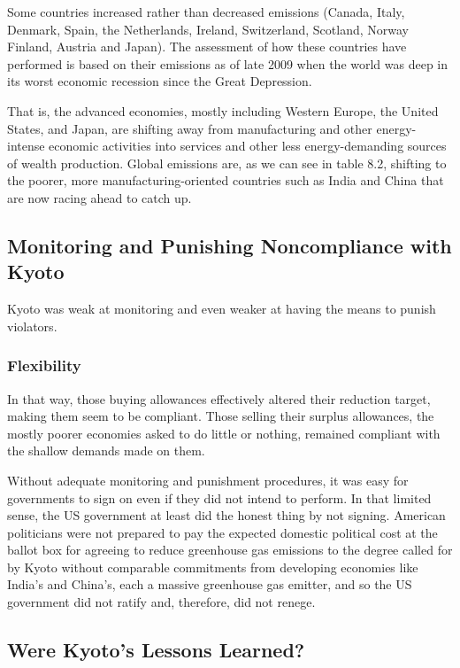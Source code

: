 Some countries increased rather than decreased emissions (Canada, Italy, Denmark, Spain, the Netherlands, Ireland, Switzerland, Scotland, Norway Finland, Austria and Japan). The assessment of how these countries have performed is based on their emissions as of late 2009 when the world was deep in its worst economic recession since the Great Depression.

That is, the advanced economies, mostly including Western Europe, the United States, and Japan, are shifting away from manufacturing and other energy-intense economic activities into services and other less energy-demanding sources of wealth production. Global emissions are, as we can see in table 8.2, shifting to the poorer, more manufacturing-oriented countries such as India and China that are now racing ahead to catch up.

\subsection{Monitoring and Punishing Noncompliance with Kyoto}

Kyoto was weak at monitoring and even weaker at having the means to punish violators.

\subsubsection{Flexibility}

In that way, those buying allowances effectively altered their reduction target, making them seem to be compliant. Those selling their surplus allowances, the mostly poorer economies asked to do little or nothing, remained compliant with the shallow demands made on them.

Without adequate monitoring and punishment procedures, it was easy for governments to sign on even if they did not intend to perform. In that limited sense, the US government at least did the honest thing by not signing. American politicians were not prepared to pay the expected domestic political cost at the ballot box for agreeing to reduce greenhouse gas emissions to the degree called for by Kyoto without comparable commitments from developing economies like India’s and China’s, each a massive greenhouse gas emitter, and so the US government did not ratify and, therefore, did not renege.

\subsection{Were Kyoto’s Lessons Learned?}

